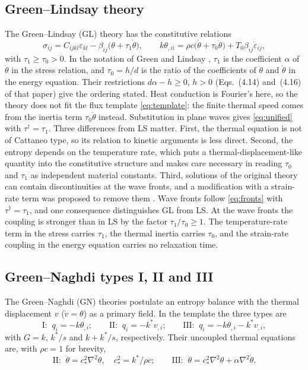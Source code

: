 \subsection{Green--Lindsay theory}\label{sec:gl}
The Green--Lindsay (GL) theory \citep{Green1972} has the constitutive relations
\begin{equation}
\sigma_{ij}=C_{ijkl}\varepsilon_{kl}-\beta_{ij}\bigl(\theta+\tau_1\dot\theta\bigr),\qquad
k\theta_{,ii}=\rho c\bigl(\dot\theta+\tau_0\ddot\theta\bigr)+T_0\beta_{ij}\dot\varepsilon_{ij},\label{eq:GL}
\end{equation}
with $\tau_1\ge\tau_0>0$. In the notation of Green and Lindsay \citep{Green1972}, $\tau_1$ is the coefficient $\alpha$ of $\dot\theta$ in the stress relation, and $\tau_0=h/d$ is the ratio of the coefficients of $\ddot\theta$ and $\dot\theta$ in the energy equation. Their restrictions $d\alpha-h\ge0$, $h>0$ (Eqs.~(4.14) and~(4.16) of that paper) give the ordering stated. Heat conduction is Fourier's here, so the theory does not fit the flux template \eqref{eq:template}: the finite thermal speed comes from the inertia term $\tau_0\ddot\theta$ instead. Substitution in plane waves gives \eqref{eq:unified} with $\tau^\dagger=\tau_1$. Three differences from LS matter. First, the thermal equation is not of Cattaneo type, so its relation to kinetic arguments is less direct. Second, the entropy depends on the temperature rate, which puts a thermal-displacement-like quantity into the constitutive structure and makes care necessary in reading $\tau_0$ and $\tau_1$ as independent material constants. Third, solutions of the original theory can contain discontinuities at the wave fronts, and a modification with a strain-rate term was proposed to remove them \citep{Yu2018ModifiedGL}. Wave fronts follow \eqref{eq:fronts} with $\tau^\dagger=\tau_1$, and one consequence distinguishes GL from LS. At the wave fronts the coupling is stronger than in LS by the factor $\tau_1/\tau_0\ge1$. The temperature-rate term in the stress carries $\tau_1$, the thermal inertia carries $\tau_0$, and the strain-rate coupling in the energy equation carries no relaxation time.

\subsection{Green--Naghdi types I, II and III}\label{sec:gn}
The Green--Naghdi (GN) theories \citep{Green1991,GreenGN1992,Green1993} postulate an entropy balance with the thermal displacement $v$ ($\dot v=\theta$) as a primary field. In the template the three types are
\begin{equation}
\text{I: }\ q_i=-k\theta_{,i};\qquad
\text{II: }\ q_i=-k^*v_{,i};\qquad
\text{III: }\ q_i=-k\theta_{,i}-k^*v_{,i},
\end{equation}
with $G=k$, $k^*/s$ and $k+k^*/s$, respectively. Their uncoupled thermal equations are, with $\rho c=1$ for brevity,
\begin{equation}
\text{II: }\ \ddot\theta=c_*^2\nabla^2\theta,\quad c_*^2=k^*/\rho c;\qquad
\text{III: }\ \ddot\theta=c_*^2\nabla^2\theta+\alpha\nabla^2\dot\theta.
\end{equation}
